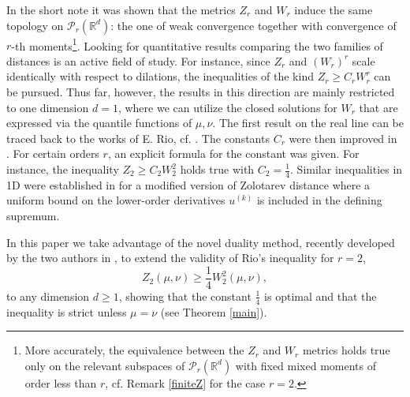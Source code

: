 \documentclass[11pt,reqno]{amsart}
\theoremstyle{definition}
\numberwithin{equation}{section}
\newcommand{\R}{\mathbb{R}}
\newcommand{\Rd}{{\R^d}}
\newcommand{\PP}{\mathcal{P}}
\newcommand{\red}{\textcolor{red}}
\begin{document}


In the short note \cite{belili2000} it was shown that the metrics $Z_r$ and $W_r$ induce the same topology on $\PP_r(\Rd)$: the one of weak convergence together with convergence of $r$-th moments\footnote{More accurately, the equivalence between the $Z_r$ and $W_r$ metrics holds true only on the relevant subspaces of $\PP_r(\Rd)$ with fixed mixed moments of order less than $r$, cf. Remark \ref{finiteZ} for the case $r=2$.}. Looking for quantitative results comparing the two families of distances is an active field of study. For instance, since $Z_r$ and $(W_r)^r$  scale identically with respect to dilations, the inequalities of the kind $Z_r \ge  C_r  W_r^r$ can be pursued. Thus far, however, the results in this direction are mainly restricted to one dimension $d=1$, where we can utilize the closed solutions for $W_r$ that are expressed via the quantile functions of $\mu,\nu$. The first result on the real line can be traced back to the works of E. Rio, cf. \cite{Rio1998}. The constants $C_r$ were then improved in \cite{rio2009}. For certain orders $r$, an explicit formula for the constant was given. For instance, the inequality  $Z_2 \ge  C_2  W_2^2$ holds true with $C_2 = \frac{1}{4}$. Similar inequalities in 1D were established in \cite{bobkov2023} for a modified version of Zolotarev distance where a uniform bound on the lower-order derivatives $u^{(k)}$ is included in the defining supremum. 












In this paper we take advantage of the  novel duality method, recently developed by the two authors in \cite{bolbou2024}, to extend the validity of Rio's inequality for $r=2$,
\begin{equation}\label{Rio-opt}
Z_2(\mu,\nu) \ge  \frac1{4} W_2^2(\mu,\nu),
\end{equation}
to any dimension $d \geq 1$, showing that the constant $\frac1{4}$ is optimal and that the inequality is strict unless $\mu=\nu$ (see Theorem \ref{main}). 
\end{document}
